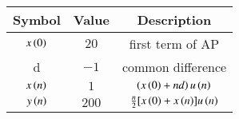 \begin{tabular}{|c|c|c|}
   \hline
   \textbf{Symbol} & \textbf{Value}& \textbf{Description} \\
   \hline
        $ x\left(0\right)$ & $20$ & first term of AP\\
        \hline
        d & ${-1}$ & common difference\\
        \hline
        $x\left(n\right)$ & $1$  & $\left(x\left(0\right)+nd\right)u\left(n\right)$\\
        \hline
        $y\left(n\right)$ & $200$ & $\frac{n}{2}[x\left(0\right)+x\left(n\right)]u\left(n\right)$\\
        \hline
\end{tabular}

